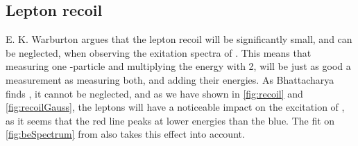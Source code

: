 \subsection{Lepton recoil}
E. K. Warburton \cite{PhysRevC.33.303} argues that the lepton recoil will be significantly small, and can be neglected, when observing the exitation spectra of \ber. This means that measuring one \al-particle and multiplying the energy with 2, will be just as good a measurement as measuring both, and adding their energies. 
As Bhattacharya finds \cite{Bhattacharya:2002gc}, it cannot be neglected, and as we have shown in \cref{fig:recoil} and \cref{fig:recoilGauss}, the leptons will have a noticeable impact on the excitation of \ber, as it seems that the red line peaks at lower energies than the blue. The fit on \cref{fig:beSpectrum} from \cite{bata} also takes this effect into account. 


